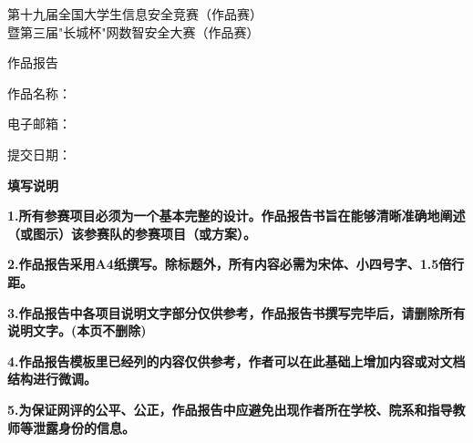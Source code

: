 \documentclass[a4paper,12pt,UTF8]{ctexart}
\numberwithin{figure}{section}
\numberwithin{table}{section}
\numberwithin{equation}{section}
\begin{document}
\normalem  %

\newpage
\null
\thispagestyle{empty}
\vspace*{2cm}
\begin{center}
  {\songti
    第十九届全国大学生信息安全竞赛（作品赛）\\[6pt]
    暨第三届"长城杯"网数智安全大赛（作品赛）\par}
  \vspace{0.8cm}
  {\songti 作品报告\par}
\end{center}
\vspace{1cm}
\noindent{}
\vspace{2cm}
\begin{center}
  {\heiti 作品名称：\uline{\hspace{9cm}}\par}
  \vspace{0.8cm}
  {\heiti 电子邮箱：\uline{\hspace{9cm}}\par}
  \vspace{0.8cm}
  {\heiti 提交日期：\uline{\hspace{9cm}}\par}
\end{center}
\newpage

\null
\thispagestyle{empty}
\begin{center}
  {\heiti\bfseries 填写说明\par}
\end{center}
\vspace{0.5cm}
{\heiti\bfseries
  1.\quad 所有参赛项目必须为一个基本完整的设计。作品报告书旨在能够清晰准确地阐述（或图示）该参赛队的参赛项目（或方案）。\par}
{\heiti\bfseries
  2.\enspace 作品报告采用A4纸撰写。除标题外，所有内容必需为宋体、小四号字、1.5倍行距。\par}
{\heiti\bfseries
  3.\enspace 作品报告中各项目说明文字部分仅供参考，作品报告书撰写完毕后，请删除所有说明文字。(本页不删除)\par}
{\heiti\bfseries
  4.\enspace 作品报告模板里已经列的内容仅供参考，作者可以在此基础上增加内容或对文档结构进行微调。\par}
{\heiti\bfseries
  5.\enspace 为保证网评的公平、公正，作品报告中应避免出现作者所在学校、院系和指导教师等泄露身份的信息。\par}
\newpage
\end{document}

